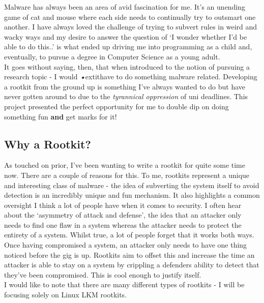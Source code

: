 \documentclass[11pt]{article}
\begin{document}
Malware has always been an area of avid fascination for me. It's an unending game of cat and mouse where each side needs to continually try to outsmart one another. I have always loved the challenge of trying to subvert rules in weird and wacky ways and my desire to answer the question of `I wonder whether I'd be able to do this..' is what ended up driving me into programming as a child and, eventually, to pursue a degree in Computer Science as a young adult.\\

It goes without saying, then, that when introduced to the notion of pursuing a research topic - I would \textit{•}extit{have} to do something malware related. Developing a rootkit from the ground up is something I've always wanted to do but have never gotten around to due to the \textit{tyrannical oppression} of uni deadlines. This project presented the perfect opportunity for me to double dip on doing something fun \textbf{and} get marks for it!\\

\subsection{Why a Rootkit?}
As touched on prior, I've been wanting to write a rootkit for quite some time now. There are a couple of reasons for this. To me, rootkits represent a unique and interesting class of malware - the idea of subverting the system itself to avoid detection is an incredibly unique and fun mechanism. It also highlights a common oversight I think a lot of people have when it comes to security. I often hear about the `asymmetry of attack and defense', the idea that an attacker only needs to find one flaw in a system whereas the attacker needs to protect the entirety of a system. Whilst true, a lot of people forget that it works both ways. Once having compromised a system, an attacker only needs to have one thing noticed before the gig is up. Rootkits aim to offset this and increase the time an attacker is able to stay on a system by crippling a defenders ability to detect that they've been compromised. This is cool enough to justify itself.\\

I would like to note that there are many different types of rootkits - I will be focusing solely on Linux LKM rootkits.
\end{document}
